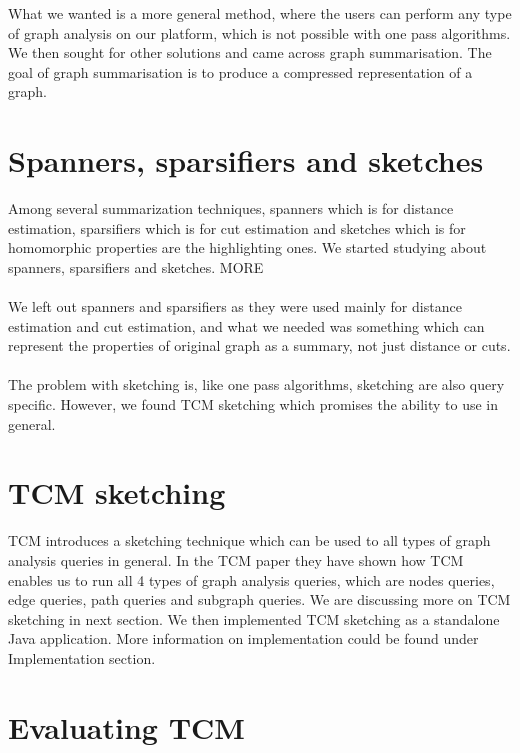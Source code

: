 \documentclass[12pt]{report}
\numberwithin{figure}{section}
\numberwithin{table}{section}
\begin{document}
What we wanted is a more general method, where the users can perform any type of graph analysis on our platform, which is not possible with one pass algorithms. We then sought for other solutions and came across graph summarisation. The goal of graph summarisation is to produce a compressed representation of a graph. 

\section{Spanners, sparsifiers and sketches}

Among several summarization techniques, spanners which is for distance estimation, sparsifiers which is for cut estimation and sketches which is for homomorphic properties are the highlighting ones. We started studying about spanners, sparsifiers and sketches. MORE

\paragraph{}

We left out spanners and sparsifiers as they were used mainly for distance estimation and cut estimation, and what we needed was something which can represent the properties of original graph as a summary, not just distance or cuts.

\paragraph{}

The problem with sketching is, like one pass algorithms, sketching are also query specific. However, we found TCM sketching which promises the ability to use in general. 

\section{TCM sketching}

TCM introduces a sketching technique which can be used to all types of graph analysis queries in general. In the TCM paper they have shown how TCM enables us to run all 4 types of graph analysis queries, which are nodes queries, edge queries, path queries and subgraph queries. We are discussing more on TCM sketching in next section. We then implemented TCM sketching as a standalone Java application. More information on implementation could be found under Implementation section.

\section{Evaluating TCM}
\end{document}
